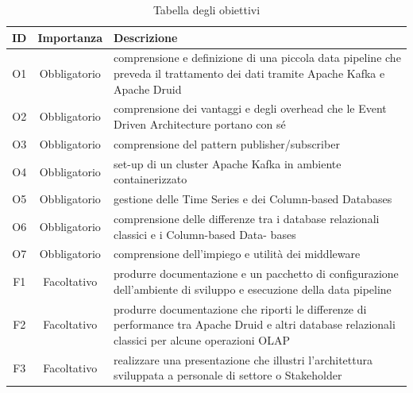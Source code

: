  \begin{table}[htbp]
    \centering
    \caption{Tabella degli obiettivi}    
    \label{tab:Tabella1}
    \begin{tabularx}{\textwidth}{|c|c|X|}
        \hline
        \textbf{ID} & \textbf{Importanza} & \textbf{Descrizione} \\\hline
        O1 & Obbligatorio & comprensione e definizione di una piccola data pipeline  che  preveda il trattamento dei dati
        tramite Apache Kafka e Apache Druid \\\hline
        O2 & Obbligatorio & comprensione dei vantaggi e degli overhead  che le Event Driven Architecture portano con
        sé\\\hline
        O3 & Obbligatorio & comprensione del pattern publisher/subscriber \\\hline
        O4 & Obbligatorio & set-up di un cluster Apache Kafka in ambiente  containerizzato \\\hline
        O5 & Obbligatorio & gestione delle Time Series e dei Column-based Databases \\\hline
        O6 & Obbligatorio & comprensione delle differenze tra i database relazionali  classici   e i Column-based Data-
        bases\\\hline
        O7 & Obbligatorio &comprensione dell’impiego e utilità dei middleware \\\hline
        F1 & Facoltativo & produrre documentazione e un pacchetto di configurazione  dell’ambiente di sviluppo e
        esecuzione  della data pipeline\\\hline
        F2 & Facoltativo & produrre documentazione che riporti  le differenze  di performance  tra Apache Druid e altri
         database relazionali classici per alcune  operazioni OLAP \\\hline
        F3 & Facoltativo & realizzare una presentazione che illustri l’architettura  sviluppata  a personale di settore o
        Stakeholder \\\hline
    \end{tabularx} 

\end{table}

\pagebreak
